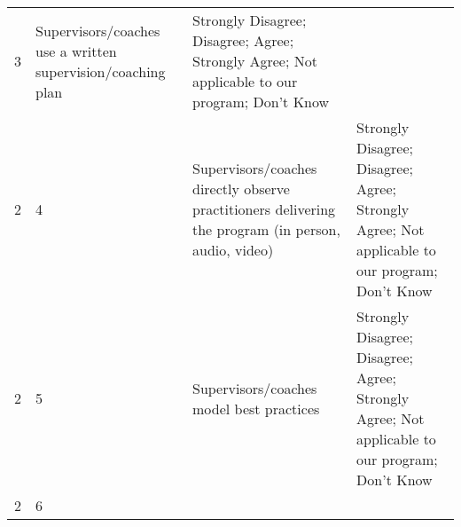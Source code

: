 \documentclass[]{article}
\begin{document}
\begin{longtable}[]{@{}llll@{}}
\begin{minipage}[t]{0.04\columnwidth}
3\strut
\end{minipage} & \begin{minipage}[t]{0.41\columnwidth}\raggedright\strut
Supervisors/coaches use a written supervision/coaching plan\strut
\end{minipage} & \begin{minipage}[t]{0.39\columnwidth}\raggedright\strut
Strongly Disagree; Disagree; Agree; Strongly Agree; Not applicable to
our program; Don't Know\strut
\end{minipage}\tabularnewline
\begin{minipage}[t]{0.05\columnwidth}\raggedright\strut
2\strut
\end{minipage} & \begin{minipage}[t]{0.04\columnwidth}\raggedright\strut
4\strut
\end{minipage} & \begin{minipage}[t]{0.41\columnwidth}\raggedright\strut
Supervisors/coaches directly observe practitioners delivering the
program (in person, audio, video)\strut
\end{minipage} & \begin{minipage}[t]{0.39\columnwidth}\raggedright\strut
Strongly Disagree; Disagree; Agree; Strongly Agree; Not applicable to
our program; Don't Know\strut
\end{minipage}\tabularnewline
\begin{minipage}[t]{0.05\columnwidth}\raggedright\strut
2\strut
\end{minipage} & \begin{minipage}[t]{0.04\columnwidth}\raggedright\strut
5\strut
\end{minipage} & \begin{minipage}[t]{0.41\columnwidth}\raggedright\strut
Supervisors/coaches model best practices\strut
\end{minipage} & \begin{minipage}[t]{0.39\columnwidth}\raggedright\strut
Strongly Disagree; Disagree; Agree; Strongly Agree; Not applicable to
our program; Don't Know\strut
\end{minipage}\tabularnewline
\begin{minipage}[t]{0.05\columnwidth}\raggedright\strut
2\strut
\end{minipage} & \begin{minipage}[t]{0.04\columnwidth}\raggedright\strut
6\strut
\end{minipage} & \begin{minipage}[t]{0.41\columnwidth}\raggedright\strut

\end{minipage}
\end{longtable}
\end{document}
